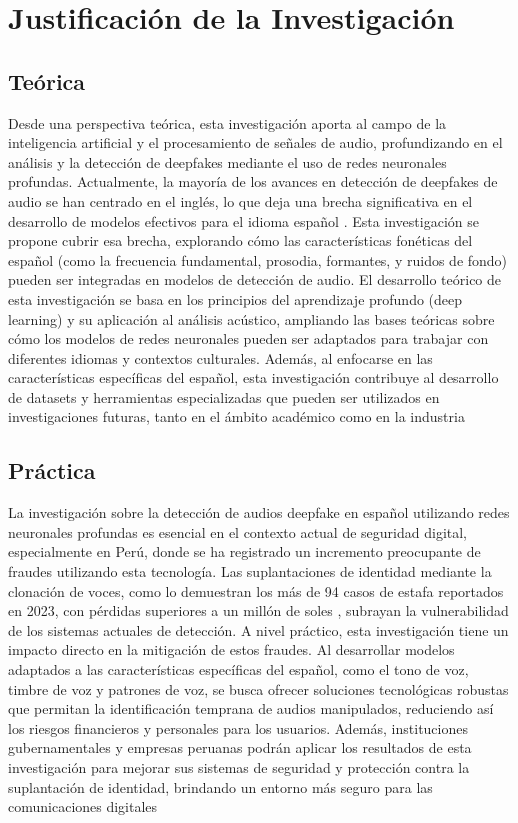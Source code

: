 \section{Justificación de la Investigación}

\subsection{Teórica}
Desde una perspectiva teórica, esta investigación aporta al campo de la inteligencia artificial y el procesamiento de señales de audio, profundizando en el análisis y la detección de deepfakes mediante el uso de redes neuronales profundas. Actualmente, la mayoría de los avances en detección de deepfakes de audio se han centrado en el inglés, lo que deja una brecha significativa en el desarrollo de modelos efectivos para el idioma español \parencite{heidari2023}. Esta investigación se propone cubrir esa brecha, explorando cómo las características fonéticas del español (como la frecuencia fundamental, prosodia, formantes, y ruidos de fondo) pueden ser integradas en modelos de detección de audio. El desarrollo teórico de esta investigación se basa en los principios del aprendizaje profundo (deep learning) y su aplicación al análisis acústico, ampliando las bases teóricas sobre cómo los modelos de redes neuronales pueden ser adaptados para trabajar con diferentes idiomas y contextos culturales. Además, al enfocarse en las características específicas del español, esta investigación contribuye al desarrollo de datasets y herramientas especializadas que pueden ser utilizados en investigaciones futuras, tanto en el ámbito académico como en la industria 

\subsection{Práctica}
La investigación sobre la detección de audios deepfake en español utilizando redes neuronales profundas es esencial en el contexto actual de seguridad digital, especialmente en Perú, donde se ha registrado un incremento preocupante de fraudes utilizando esta tecnología. Las suplantaciones de identidad mediante la clonación de voces, como lo demuestran los más de 94 casos de estafa reportados en 2023, con pérdidas superiores a un millón de soles \parencite{rojas2023}, subrayan la vulnerabilidad de los sistemas actuales de detección. A nivel práctico, esta investigación tiene un impacto directo en la mitigación de estos fraudes. Al desarrollar modelos adaptados a las características específicas del español, como el tono de voz, timbre de voz y patrones de voz, se busca ofrecer soluciones tecnológicas robustas que permitan la identificación temprana de audios manipulados, reduciendo así los riesgos financieros y personales para los usuarios. Además, instituciones gubernamentales y empresas peruanas podrán aplicar los resultados de esta investigación para mejorar sus sistemas de seguridad y protección contra la suplantación de identidad, brindando un entorno más seguro para las comunicaciones digitales 

